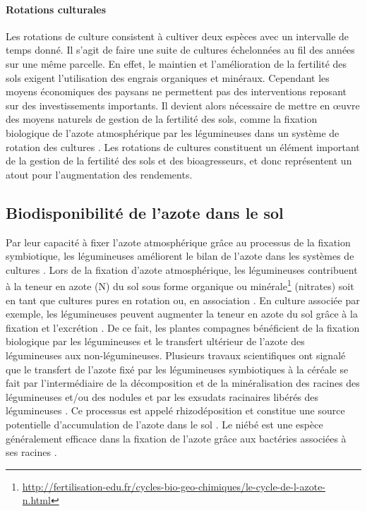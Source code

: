 \documentclass[a4paper,11pt]{article}
\begin{document}
\paragraph{Rotations culturales} Les rotations de culture consistent à
cultiver deux espèces avec un intervalle de temps donné. Il s'agit de
faire une suite de cultures échelonnées au fil des années sur une même
parcelle. En effet, le maintien et l'amélioration de la fertilité des
sols exigent l'utilisation des engrais organiques et
minéraux. Cependant les moyens économiques des paysans ne permettent
pas des interventions reposant sur des investissements importants. Il
devient alors nécessaire de mettre en œuvre des moyens naturels de
gestion de la fertilité des sols, comme la fixation biologique de
l'azote atmosphérique par les légumineuses dans un système de rotation
des cultures \cite{TRAORE_2009}. Les rotations de cultures constituent
un élément important de la gestion de la fertilité des sols et des
bioagresseurs, et donc représentent un atout pour l'augmentation des
rendements.


\subsection{Biodisponibilité de l'azote dans le sol}

Par leur capacité à fixer l'azote atmosphérique grâce au processus de
la fixation symbiotique, les légumineuses améliorent le bilan de
l'azote dans les systèmes de cultures
\cite{Ndakidemi_2005,Fustec11}. Lors de la fixation d'azote
atmosphérique, les légumineuses contribuent à la teneur en azote (N)
du sol sous forme organique ou
minérale\footnote{\url{http://fertilisation-edu.fr/cycles-bio-geo-chimiques/le-cycle-de-l-azote-n.html}}
(nitrates) soit en tant que cultures pures en rotation ou, en
association \cite{Bado_2006,Chu_2004,Makoi_2009,Ndakidemi_2005}. En
culture associée par exemple, les légumineuses peuvent augmenter la
teneur en azote du sol grâce à la fixation et l'excrétion
\cite{Trenbath_1976,Fustec11}. De ce fait, les plantes compagnes
bénéficient de la fixation biologique par les légumineuses et le
transfert ultérieur de l'azote des légumineuses aux
non-légumineuses. Plusieurs travaux scientifiques ont signalé que le
transfert de l'azote fixé par les légumineuses symbiotiques à la
céréale se fait par l'intermédiaire de la décomposition et de la
minéralisation des racines des légumineuses et/ou des nodules
\cite{Burity_1989} et par les exsudats racinaires libérés des
légumineuses \cite{Ndakidemi_2005,Makoi_2009}. Ce processus est appelé
rhizodéposition \cite{Fustec11} et constitue une source potentielle
d'accumulation de l'azote dans le sol \cite{Koulibi_FideleZONGO}. Le
niébé est une espèce généralement efficace dans la fixation de l'azote
grâce aux bactéries associées à ses racines \cite{TRAORE_2009}.

\newpage



\end{document}
